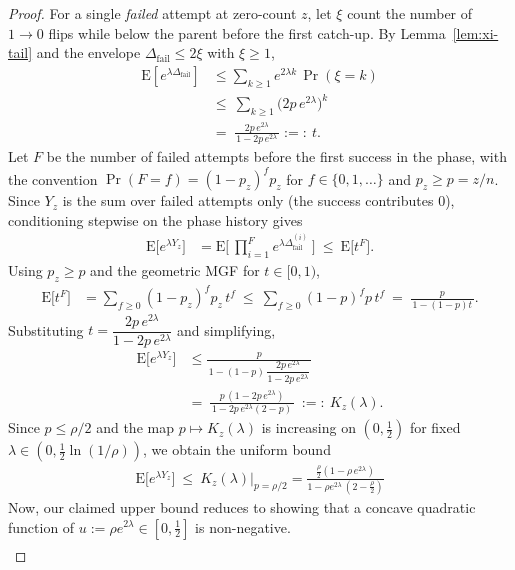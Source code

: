 \documentclass[lettersize,journal]{IEEEtran}
\newcommand{\EE}{\text{E}}
\begin{document}
\begin{proof}
	For a single \emph{failed} attempt at zero-count $z$, let $\xi$ count the number of $1\!\to 0$ flips while below the parent before the first catch-up.
	By Lemma~\ref{lem:xi-tail} and the envelope $\Delta_{\mathrm{fail}}\le 2\xi$ with $\xi\ge 1$,
	\begin{align*}
		\EE\!\left[e^{\lambda \Delta_{\mathrm{fail}}}\right]
		&\le \sum_{k\ge 1} e^{2\lambda k}\,\Pr(\xi=k)
		\\ &\le\ \sum_{k\ge 1} \big(2p\,e^{2\lambda}\big)^{k}
		\\ &=\ \frac{2p\,e^{2\lambda}}{\,1-2p\,e^{2\lambda}\,}:=:\ t.
	\end{align*}
	Let $F$ be the number of failed attempts before the first success in the phase, with the convention
	$\Pr(F=f)=(1-p_z)^f p_z$ for $f\in\{0,1,\ldots\}$ and $p_z\ge p=z/n$.
	Since $Y_z$ is the sum over failed attempts only (the success contributes $0$), conditioning stepwise on the phase history gives
	\begin{align*}
		\EE\!\big[e^{\lambda Y_z}\big]
		&=\EE\!\Big[\ \prod_{i=1}^{F} e^{\lambda \Delta_{\mathrm{fail}}^{(i)}}\ \Big]
		\ \le\ \EE\!\big[t^{F}\big].
	\end{align*}
	Using $p_z\ge p$ and the geometric MGF for $t\in[0,1)$,
	\begin{align*}
		\EE\!\big[t^{F}\big]
		&= \sum_{f\ge 0} (1-p_z)^f p_z\, t^f
		\ \le\ \sum_{f\ge 0} (1-p)^f p\, t^f
		\ =\ \frac{p}{\,1-(1-p)t\,}.
	\end{align*}
	Substituting $t=\dfrac{2p\,e^{2\lambda}}{1-2p\,e^{2\lambda}}$ and simplifying,
	\begin{align*}
		\EE\!\big[e^{\lambda Y_z}\big]
		&\le \frac{p}{\,1-(1-p)\,\dfrac{2p\,e^{2\lambda}}{1-2p\,e^{2\lambda}}\,}
		\\ &=\ \frac{p\,(1-2p\,e^{2\lambda})}{\,1-2p\,e^{2\lambda}(2-p)\,}
		\ :=:\ K_z(\lambda).
	\end{align*}
	Since $p\le \rho/2$ and the map $p\mapsto K_z(\lambda)$ is increasing on $(0,\tfrac12)$ for fixed $\lambda\in(0,\tfrac12\ln(1/\rho))$, we obtain the uniform bound
	\begin{align*}
		\EE\!\big[e^{\lambda Y_z}\big]
		\ \le\ K_z(\lambda)\Big|_{p=\rho/2}=\frac{\tfrac{\rho}{2}(1-\rho\,e^{2\lambda})}{1-\rho e^{2\lambda}\,(2-\tfrac{\rho}{2})}
	\end{align*}
	Now, our claimed upper bound reduces to showing that a concave quadratic function of $u:=\rho e^{2\lambda} \in \left[0,\frac{1}{2}\right]$ is non-negative.
	\begin{align*}

\end{align*}
\end{proof}
\end{document}
